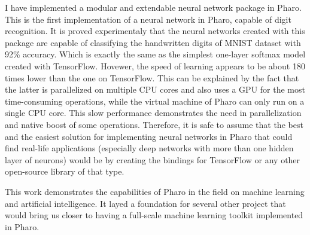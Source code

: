 I have implemented a modular and extendable neural network package in Pharo. This is the first implementation of a neural network in Pharo, capable of digit recognition. It is proved experimentaly that the neural networks created with this package are capable of classifying the handwritten digits of MNIST dataset with 92\% accuracy. Which is exactly the same as the simplest one-layer softmax model created with TensorFlow. Hovewer, the speed of learning appears to be about 180 times lower than the one on TensorFlow. This can be explained by the fact that the latter is parallelized on multiple CPU cores and also uses a GPU for the most time-consuming operations, while the virtual machine of Pharo can only run on a single CPU core. This slow performance demonstrates the need in parallelization and native boost of some operations. Therefore, it is safe to assume that the best and the easiest solution for implementing neural networks in Pharo that could find real-life applications (especially deep networks with more than one hidden layer of neurons) would be by creating the bindings for TensorFlow or any other open-source library of that type.

This work demonstrates the capabilities of Pharo in the field on machine learning and artificial intelligence. It layed a foundation for several other project that would bring us closer to having a full-scale machine learning toolkit implemented in Pharo.
